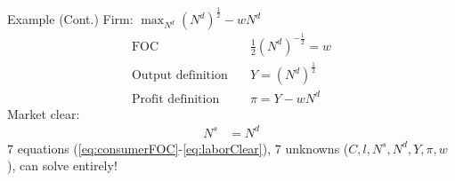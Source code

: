 \documentclass[11pt,aspectratio=43]{beamer}
\theoremstyle{definition}
\begin{document}
\begin{frame}{Example (Cont.)}
\label{slide:Example__Cont__}
    Firm: $ \max_{N^{d}} ( N^{d} )^{\frac{1}{2}} - w N^{d} $
    \begin{align}
        \text{FOC} \quad
            & \frac{1}{2} ( N^{d} )^{- \frac{1}{2}} = w
            \label{eq:firmFOC}
        \\
        \text{Output definition} \quad
            & Y = ( N^{d} )^{\frac{1}{2}}
            \label{eq:outputDef}
        \\
        \text{Profit definition} \quad
            & \pi = Y - w N^{d}
            \label{eq:profitDef}
    \end{align}
    Market clear:
    \begin{align}
        N^{s} & = N^{d}
        \label{eq:laborClear}
    \end{align}
$ 7 $ equations (\eqref{eq:consumerFOC}-\eqref{eq:laborClear}), $ 7  $ unknowns ($C, l, N^{s}, N^{d}, Y, \pi, w$), can solve entirely!
\end{frame}
\end{document}
